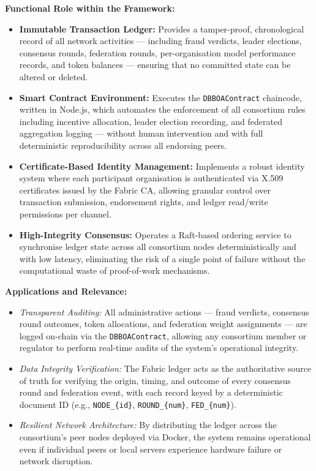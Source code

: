 \textbf{Functional Role within the Framework:}
\begin{itemize}
    \item \textbf{Immutable Transaction Ledger:} Provides a tamper-proof, chronological record of all network activities — including fraud verdicts, leader elections, consensus rounds, federation rounds, per-organisation model performance records, and token balances — ensuring that no committed state can be altered or deleted.
    \item \textbf{Smart Contract Environment:} Executes the \texttt{DBBOAContract} chaincode, written in Node.js, which automates the enforcement of all consortium rules including incentive allocation, leader election recording, and federated aggregation logging — without human intervention and with full deterministic reproducibility across all endorsing peers.
    \item \textbf{Certificate-Based Identity Management:} Implements a robust identity system where each participant organisation is authenticated via X.509 certificates issued by the Fabric CA, allowing granular control over transaction submission, endorsement rights, and ledger read/write permissions per channel.
    \item \textbf{High-Integrity Consensus:} Operates a Raft-based ordering service to synchronise ledger state across all consortium nodes deterministically and with low latency, eliminating the risk of a single point of failure without the computational waste of proof-of-work mechanisms.
\end{itemize}

\textbf{Applications and Relevance:}
\begin{itemize}
    \item \textit{Transparent Auditing:} All administrative actions — fraud verdicts, consensus round outcomes, token allocations, and federation weight assignments — are logged on-chain via the \texttt{DBBOAContract}, allowing any consortium member or regulator to perform real-time audits of the system's operational integrity.
    \item \textit{Data Integrity Verification:} The Fabric ledger acts as the authoritative source of truth for verifying the origin, timing, and outcome of every consensus round and federation event, with each record keyed by a deterministic document ID (e.g., \texttt{NODE\_\{id\}}, \texttt{ROUND\_\{num\}}, \texttt{FED\_\{num\}}).
    \item \textit{Resilient Network Architecture:} By distributing the ledger across the consortium's peer nodes deployed via Docker, the system remains operational even if individual peers or local servers experience hardware failure or network disruption.
\end{itemize}


